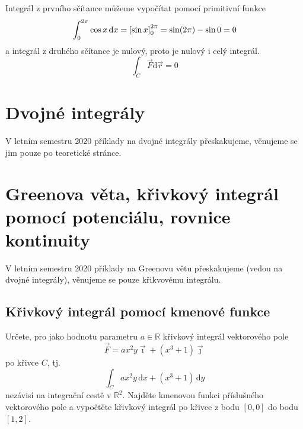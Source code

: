 Integrál z prvního sčítance můžeme vypočítat pomocí primitivní funkce
$$\int_0^{2\pi} \cos x\,\mathrm dx=\qty[\sin x]_0^{2\pi}=\sin(2\pi)-\sin 0 =0$$ a integrál z druhého sčítance je nulový, proto je nulový i celý integrál.
$$\int_C\vec F\mathrm d\vec r=0$$


\konec


\stranka
\section{Dvojné integrály}

V letním semestru 2020 příklady na dvojné integrály přeskakujeme, věnujeme se jim pouze po teoretické stránce.





\section{Greenova věta, křivkový integrál pomocí potenciálu, rovnice kontinuity}

V letním semestru 2020 příklady na Greenovu větu přeskakujeme (vedou na dvojné integrály), věnujeme se pouze křikvovému integrálu. 


\subsection{Křivkový integrál pomocí kmenové funkce}


Určete, pro jako hodnotu parametru $a\in \mathbb R$ křivkový integrál vektorového pole $$\vec F=ax^2y\vec\imath + (x^3+1)\vec\jmath$$ po křivce $C$, tj. $$\int_C ax^2y\,\mathrm dx+(x^3+1)\,\mathrm dy$$ nezávisí na integrační cestě v $\mathbb R^2$. Najděte kmenovou funkci příslušného vektorového pole a vypočtěte křivkový integrál po křivce z bodu $[0,0]$ do bodu $[1,2]$.

